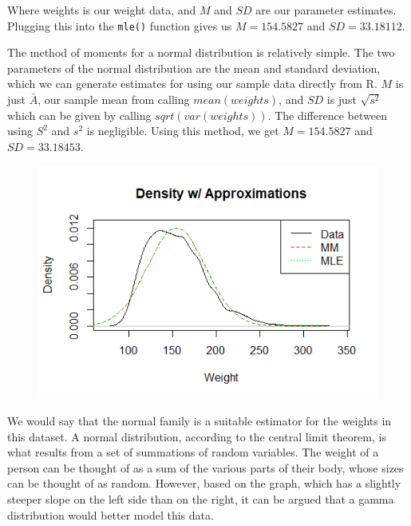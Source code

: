 \documentclass[12pt, a4paper, oneside]{report}
\begin{document}
Where weights is our weight data, and \(M\) and \(SD\) are our parameter estimates. Plugging this into the \lstinline{mle()} function gives us \(M = 154.5827\) and \(SD = 33.18112\).

The method of moments for a normal distribution is relatively simple. The two parameters of the normal distribution are the mean and standard deviation, which we can generate estimates for using our sample data directly from R. \(M\) is just \(\bar{A}\), our sample mean from calling \(mean(weights)\), and \(SD\) is just \(\sqrt{s^2}\) which can be given by calling \(sqrt(var(weights))\). The difference between using \(S^2\) and \(s^2\) is negligible. Using this method, we get \(M = 154.5827\) and \(SD = 33.18453\).

\begin{figure}[h]
  \centering
  \includegraphics[width=\linewidth]{normDensityA.png}
\end{figure}

\newpage
We would say that the normal family is a suitable estimator for the weights in this dataset. A normal distribution, according to the central limit theorem, is what results from a set of summations of random variables. The weight of a person can be thought of as a sum of the various parts of their body, whose sizes can be thought of as random. 
However, based on the graph, which has a slightly steeper slope on the left side than on the right, it can be argued that a gamma distribution would better model this data. 
\end{document}

